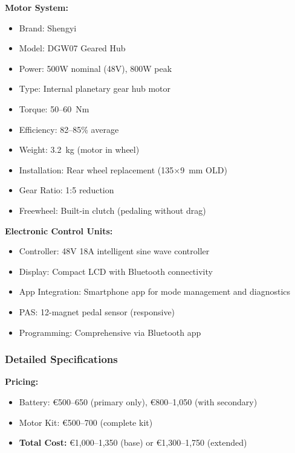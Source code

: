 \documentclass[12pt,a4paper]{article}
\begin{document}
\textbf{Motor System:}
\begin{itemize}
    \item Brand: Shengyi
    \item Model: DGW07 Geared Hub \cite{shengyi-dgw07}
    \item Power: 500W nominal (48V), 800W peak
    \item Type: Internal planetary gear hub motor
    \item Torque: 50--60~Nm
    \item Efficiency: 82--85\% average
    \item Weight: 3.2~kg (motor in wheel)
    \item Installation: Rear wheel replacement (135×9~mm OLD)
    \item Gear Ratio: 1:5 reduction
    \item Freewheel: Built-in clutch (pedaling without drag)
\end{itemize}

\textbf{Electronic Control Units:}
\begin{itemize}
    \item Controller: 48V 18A intelligent sine wave controller
    \item Display: Compact LCD with Bluetooth connectivity
    \item App Integration: Smartphone app for mode management and diagnostics
    \item PAS: 12-magnet pedal sensor (responsive)
    \item Programming: Comprehensive via Bluetooth app
\end{itemize}

\subsubsection{Detailed Specifications}

\textbf{Pricing:}
\begin{itemize}
    \item Battery: €500--650 (primary only), €800--1,050 (with secondary) \cite{aliexpress-batteries}
    \item Motor Kit: €500--700 (complete kit) \cite{aliexpress-batteries}
    \item \textbf{Total Cost:} €1,000--1,350 (base) or €1,300--1,750 (extended)
\end{itemize}
\end{document}
